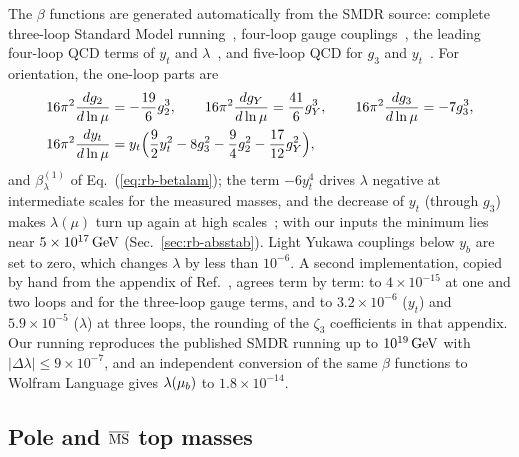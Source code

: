 The $\beta$ functions are generated automatically from the SMDR source: complete three-loop Standard Model running~\cite{Mihaila:2012fm,Bednyakov:2012rb,Bednyakov:2012en,Bednyakov:2013eba,Chetyrkin:2012rz,Chetyrkin:2013wya}, four-loop gauge couplings~\cite{Bednyakov:2015ooa,Zoller:2015tha,Davies:2019onf}, the leading four-loop QCD terms of $y_t$ and $\lambda$~\cite{Chetyrkin:1997dh,Vermaseren:1997fq,Martin:2015eia,Chetyrkin:2016ruf}, and five-loop QCD for $g_3$ and $y_t$~\cite{Baikov:2016tgj,Herzog:2017ohr,Baikov:2014qja}.
For orientation, the one-loop parts are
\begin{align}
16\pi^2\frac{dg_2}{d\ln\mu}&=-\frac{19}{6}g_2^3,\qquad 16\pi^2\frac{dg_Y}{d\ln\mu}=\frac{41}{6}g_Y^3,\qquad 16\pi^2\frac{dg_3}{d\ln\mu}=-7g_3^3,\nonumber\\
16\pi^2\frac{dy_t}{d\ln\mu}&=y_t\Bigl(\frac92y_t^2-8g_3^2-\frac94g_2^2-\frac{17}{12}g_Y^2\Bigr),
\label{eq:rb-beta1}
\end{align}
and $\beta_\lambda^{(1)}$ of Eq.~(\ref{eq:rb-betalam}); the term $-6y_t^4$ drives $\lambda$ negative at intermediate scales for the measured masses, and the decrease of $y_t$ (through $g_3$) makes $\lambda(\mu)$ turn up again at high scales~\cite{Degrassi:2012ry,Buttazzo:2013uya}; with our inputs the minimum lies near $5\times10^{17}\,\mathrm{GeV}$ (Sec.~\ref{sec:rb-absstab}). %
Light Yukawa couplings below $y_b$ are set to zero, which changes $\lambda$ by less than $10^{-6}$. %
A second implementation, copied by hand from the appendix of Ref.~\cite{Buttazzo:2013uya}, agrees term by term: to $4\times10^{-15}$ at one and two loops and for the three-loop gauge terms, and to $3.2\times10^{-6}$ ($y_t$) and $5.9\times10^{-5}$ ($\lambda$) at three loops, the rounding of the $\zeta_3$ coefficients in that appendix. %
Our running reproduces the published SMDR running up to $10^{19}\,\mathrm{GeV}$ with $|\Delta\lambda|\le9\times10^{-7}$, and an independent conversion of the same $\beta$ functions to Wolfram Language gives $\lambda(\mu_b)$ to $1.8\times10^{-14}$. %

\subsection{Pole and \texorpdfstring{$\overline{\mathrm{MS}}$}{MS-bar} top masses}
\label{sec:rb-zm}

